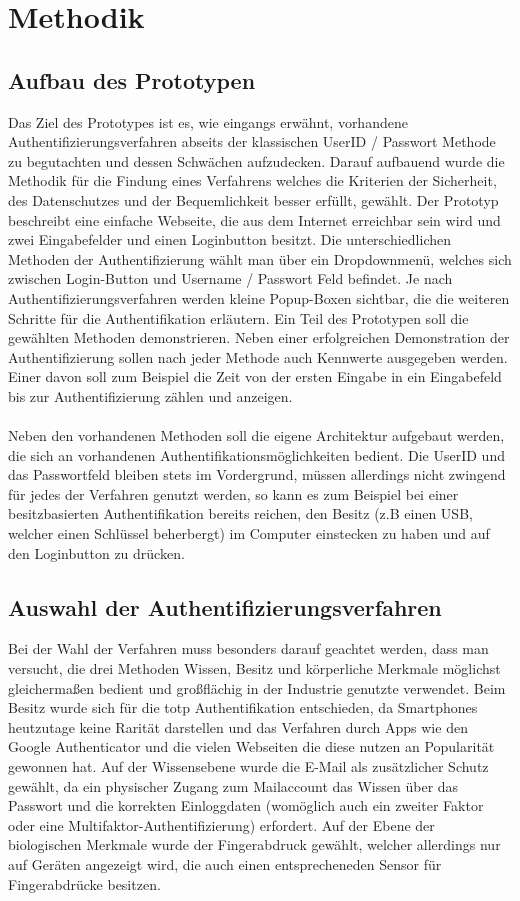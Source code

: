 \chapter{Methodik}
\section{Aufbau des Prototypen}
Das Ziel des Prototypes ist es, wie eingangs erwähnt, vorhandene Authentifizierungsverfahren abseits der klassischen UserID / Passwort Methode zu begutachten und dessen Schwächen aufzudecken. Darauf aufbauend wurde die Methodik für die Findung eines Verfahrens welches die Kriterien der Sicherheit, des Datenschutzes und der Bequemlichkeit besser erfüllt, gewählt. Der Prototyp beschreibt eine einfache Webseite, die aus dem Internet erreichbar sein wird und zwei Eingabefelder und einen Loginbutton besitzt. Die unterschiedlichen Methoden der Authentifizierung wählt man über ein Dropdownmenü, welches sich zwischen Login-Button und Username / Passwort Feld befindet. Je nach Authentifizierungsverfahren werden kleine Popup-Boxen sichtbar, die die weiteren Schritte für die Authentifikation erläutern.
Ein Teil des Prototypen soll die gewählten Methoden demonstrieren. Neben einer erfolgreichen Demonstration der Authentifizierung sollen nach jeder Methode auch Kennwerte ausgegeben werden. Einer davon soll zum Beispiel die Zeit von der ersten Eingabe in ein Eingabefeld bis zur Authentifizierung zählen und anzeigen. \\
\\
Neben den vorhandenen Methoden soll die eigene Architektur aufgebaut werden, die sich an vorhandenen Authentifikationsmöglichkeiten bedient. Die UserID und das Passwortfeld bleiben stets im Vordergrund, müssen allerdings nicht zwingend für jedes der Verfahren genutzt werden, so kann es zum Beispiel bei einer besitzbasierten Authentifikation bereits reichen, den Besitz (z.B einen USB, welcher einen Schlüssel beherbergt) im Computer einstecken zu haben und auf den Loginbutton zu drücken.

\section{Auswahl der Authentifizierungsverfahren}
Bei der Wahl der Verfahren muss besonders darauf geachtet werden, dass man versucht, die drei Methoden Wissen, Besitz und körperliche Merkmale möglichst gleichermaßen bedient und großflächig in der Industrie genutzte verwendet. Beim Besitz wurde sich für die \ac{totp} Authentifikation entschieden, da Smartphones heutzutage keine Rarität darstellen und das Verfahren durch Apps wie den Google Authenticator und die vielen Webseiten die diese nutzen an Popularität gewonnen hat. Auf der Wissensebene wurde die E-Mail als zusätzlicher Schutz gewählt, da ein physischer Zugang zum Mailaccount das Wissen über das Passwort und die korrekten Einloggdaten (womöglich auch ein zweiter Faktor oder eine Multifaktor-Authentifizierung) erfordert. Auf der Ebene der biologischen Merkmale wurde der Fingerabdruck gewählt, welcher allerdings nur auf Geräten angezeigt wird, die auch einen entsprecheneden Sensor für Fingerabdrücke besitzen.

